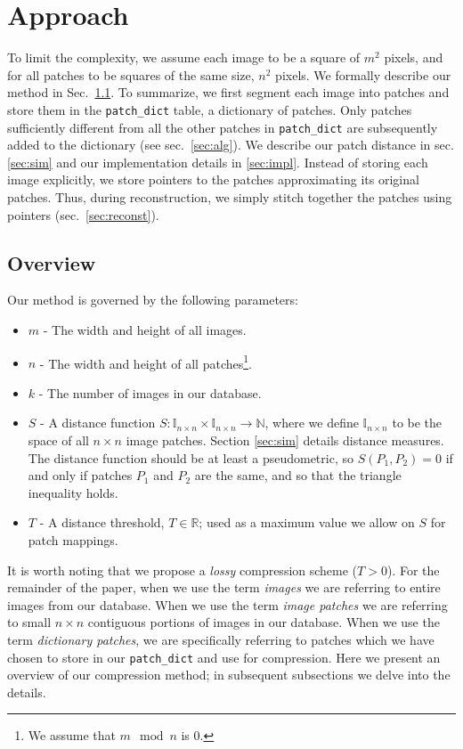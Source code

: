 \section{Approach}\label{sec:method}

To limit the complexity, we assume
each image to be a square of $m^2$ pixels, and for all patches to
be squares of the same size, $n^2$ pixels.
We formally describe our method in Sec.~\ref{sec:overview}. To summarize,
we first segment each image into patches and store them in the \texttt{patch\_dict} table, a dictionary of patches.
Only patches sufficiently different
from all the other patches in \texttt{patch\_dict} are subsequently added to the dictionary (see sec.~\ref{sec:alg}).
We describe our patch distance in sec. \ref{sec:sim} and our implementation details in \ref{sec:impl}.
Instead of storing each image explicitly, we store pointers to the patches approximating its original patches. 
Thus, during reconstruction, we simply stitch together the patches using pointers (sec.~\ref{sec:reconst}).

\subsection{Overview}
\label{sec:overview}

Our method is governed by the following parameters:
\begin{itemize}
\item $m$ - The width and height of all images.
\item $n$ - The width and height of all patches\footnote{We assume that $m \mod n$ is $0$.}.
\item $k$ - The number of images in our database.
\item $S$ - A distance function $S \colon \mathds{I}_{n \times n} \times \mathds{I}_{n \times n} \to \mathds{N}$, where we define $\mathds{I}_{n \times n}$ to be the space of all $n \times n$ image patches.  Section \ref{sec:sim} details distance measures.  The distance function should be at least a pseudometric, so $S(P_1, P_2) = 0$ if and only if patches $P_1$ and $P_2$ are the same, and so that the triangle inequality holds.
\item $T$ - A distance threshold, $T \in \mathds{R}$; used as a maximum value we allow on $S$ for patch mappings.

\end{itemize}

It is worth noting that we propose a \emph{lossy} compression scheme ($T > 0$).  For the remainder of the paper, when we use the term \emph{images} we are referring to entire images from our database.  When we use the term \emph{image patches} we are referring to small $n \times n$ contiguous portions of images in our database.  When we use the term \emph{dictionary patches}, we are specifically referring to patches which we have chosen to store in our \texttt{patch\_dict} and use for compression.  Here we present an overview of our compression method; in subsequent subsections we delve into the details.

